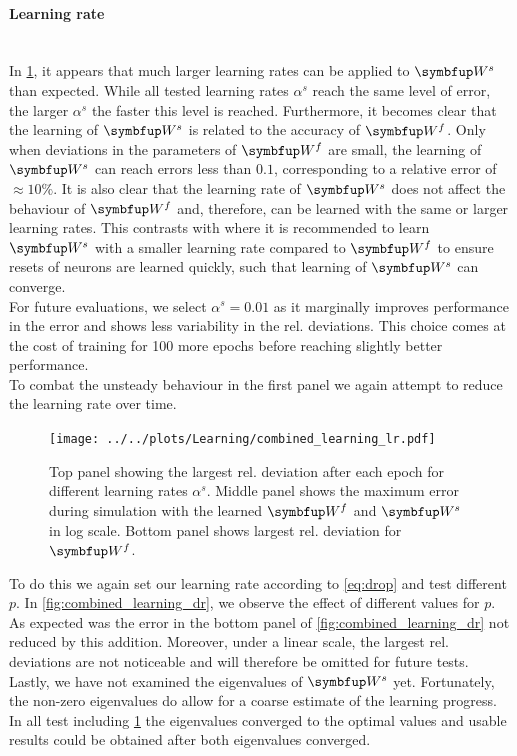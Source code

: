 \paragraph{Learning rate}\mbox{}\\
In \cref{fig:combined_learning_lr}, it appears that much larger learning rates can be applied to $\bmu{W}^s$ than expected. While all tested learning rates $\alpha^s$ reach the same level of error, the larger $\alpha^s$ the faster this level is reached. Furthermore, it becomes clear that the learning of $\bmu{W}^s$ is related to the accuracy of $\bmu{W}^f$. Only when deviations in the parameters of $\bmu{W}^f$ are small, the learning of $\bmu{W}^s$ can reach errors less than $0.1$, corresponding to a relative error of $\approx 10\%$. It is also clear that the learning rate of $\bmu{W}^s$ does not affect the behaviour of $\bmu{W}^f$ and, therefore, can be learned with the same or larger learning rates. This contrasts with \cite{bourdoukan_enforcing_2015} where it is recommended to learn $\bmu{W}^s$ with a smaller learning rate compared to $\bmu{W}^f$ to ensure resets of neurons are learned quickly, such that learning of $\bmu{W}^s$ can converge.\\
For future evaluations, we select $\alpha^s = 0.01$ as it marginally improves performance in the error and shows less variability in the rel. deviations. This choice comes at the cost of training for 100 more epochs before reaching slightly better performance.\\
To combat the unsteady behaviour in the first panel we again attempt to reduce the learning rate over time.
\begin{figure}
	\centering
	\texttt{[image: ../../plots/Learning/combined\_learning\_lr.pdf]}
	\caption{Top panel showing the largest rel. deviation after each epoch for different learning rates $\alpha^s$. Middle panel shows the maximum error during simulation with the learned $\bmu{W}^f$ and $\bmu{W}^s$ in log scale. Bottom panel shows largest rel. deviation for $\bmu{W}^f$.}
	\label{fig:combined_learning_lr}
\end{figure}
To do this we again set our learning rate according to \cref{eq:drop} and test different $p$. In \cref{fig:combined_learning_dr}, we observe the effect of different values for $p$. As expected was the error in the bottom panel of \cref{fig:combined_learning_dr} not reduced by this addition. Moreover, under a linear scale, the largest rel. deviations are not noticeable and will therefore be omitted for future tests. Lastly, we have not examined the eigenvalues of $\bmu{W}^s$ yet. Fortunately, the non-zero eigenvalues do allow for a coarse estimate of the learning progress. In all test including \cref{fig:combined_learning_lr} the eigenvalues converged to the optimal values and usable results could be obtained after both eigenvalues converged.\\
